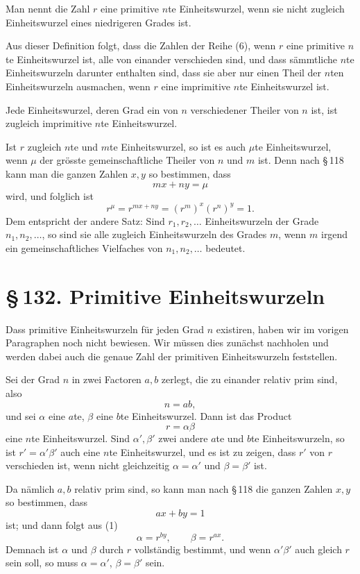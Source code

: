 \documentclass[11pt]{article}
\providecommand{\sect}[2]{\section*{\S\,#1. #2}}
\begin{document}
Man nennt die Zahl $r$ eine primitive $n$te Einheitswurzel, wenn sie nicht zugleich Einheitswurzel eines niedrigeren Grades ist.

Aus dieser Definition folgt, dass die Zahlen der Reihe (6), wenn $r$ eine primitive $n$te Einheitswurzel ist, alle von einander verschieden sind, und dass sämmtliche $n$te Einheitswurzeln darunter enthalten sind, dass sie aber nur einen Theil der $n$ten Einheitswurzeln ausmachen, wenn $r$ eine imprimitive $n$te Einheitswurzel ist.

Jede Einheitswurzel, deren Grad ein von $n$ verschiedener Theiler von $n$ ist, ist zugleich imprimitive $n$te Einheitswurzel.

Ist $r$ zugleich $n$te und $m$te Einheitswurzel, so ist es auch $\mu$te Einheitswurzel, wenn $\mu$ der grösste gemeinschaftliche Theiler von $n$ und $m$ ist. Denn nach \S\,118 kann man die ganzen Zahlen $x,y$ so bestimmen, dass
\[
        mx+ny=\mu
\]
wird, und folglich ist
\[
        r^\mu=r^{mx+ny}=(r^m)^x(r^n)^y=1.
\]
Dem entspricht der andere Satz: Sind $r_1,r_2,\ldots$ Einheitswurzeln der Grade $n_1,n_2,\ldots$, so sind sie alle zugleich Einheitswurzeln des Grades $m$, wenn $m$ irgend ein gemeinschaftliches Vielfaches von $n_1,n_2,\ldots$ bedeutet.

\sect{132}{Primitive Einheitswurzeln}

Dass primitive Einheitswurzeln für jeden Grad $n$ existiren, haben wir im vorigen Paragraphen noch nicht bewiesen. Wir müssen dies zunächst nachholen und werden dabei auch die genaue Zahl der primitiven Einheitswurzeln feststellen.

Sei der Grad $n$ in zwei Factoren $a,b$ zerlegt, die zu einander relativ prim sind, also
\[
        n=ab,
\]
und sei $\alpha$ eine $a$te, $\beta$ eine $b$te Einheitswurzel. Dann ist das Product
\[
\tag{1}        r=\alpha\beta
\]
eine $n$te Einheitswurzel. Sind $\alpha',\beta'$ zwei andere $a$te und $b$te Einheitswurzeln, so ist $r'=\alpha'\beta'$ auch eine $n$te Einheitswurzel, und es ist zu zeigen, dass $r'$ von $r$ verschieden ist, wenn nicht gleichzeitig $\alpha=\alpha'$ und $\beta=\beta'$ ist.

Da nämlich $a,b$ relativ prim sind, so kann man nach \S\,118 die ganzen Zahlen $x,y$ so bestimmen, dass
\[
\tag{2}        ax+by=1
\]
ist; und dann folgt aus (1)
\[
        \alpha=r^{by},\qquad \beta=r^{ax}.
\]
Demnach ist $\alpha$ und $\beta$ durch $r$ vollständig bestimmt, und wenn $\alpha'\beta'$ auch gleich $r$ sein soll, so muss $\alpha=\alpha'$, $\beta=\beta'$ sein.
\end{document}
